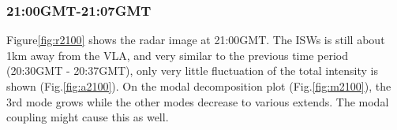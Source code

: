 

\subsubsection{21:00GMT-21:07GMT}

Figure\ref{fig:r2100} shows the radar image at 21:00GMT. The ISWs is still about
1km away from the VLA, and very similar to the previous time period
(20:30GMT - 20:37GMT), only very little fluctuation of the total
intensity is shown (Fig.\ref{fig:a2100}). On the modal decomposition plot (Fig.\ref{fig:m2100}), the 3rd mode
grows while the other modes decrease to various extends. The modal
coupling might cause this as well.

